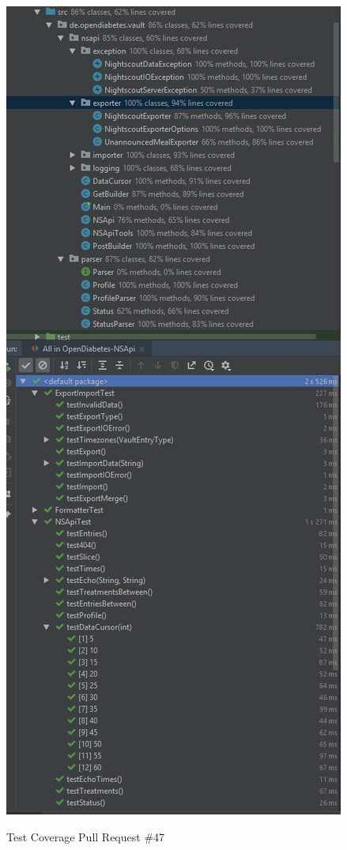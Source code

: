 \documentclass[accentcolor=tud0b,12pt,paper=a4]{tudreport}
\begin{document}
\begin{figure}[h]
\centering
\caption{Test Coverage Pull Request \#47}
\includegraphics[width=\textwidth,height=\textheight,keepaspectratio]{pr-cov-47}
\label{pr-cov:47}
\end{figure}
\end{document}
